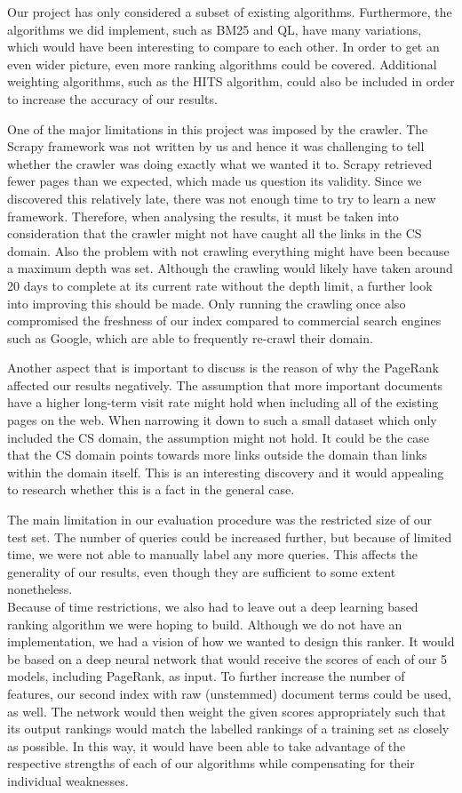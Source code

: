Our project has only considered a subset of existing algorithms. Furthermore, the algorithms we did implement, such as BM25 and QL, have many variations, which would have been interesting to compare to each other. In order to get an even wider picture, even more ranking algorithms could be covered. Additional weighting algorithms, such as the HITS algorithm, could also be included in order to increase the accuracy of our results.

One of the major limitations in this project was imposed by the crawler. The Scrapy framework was not written by us and hence it was challenging to tell whether the crawler was doing exactly what we wanted it to. Scrapy retrieved fewer pages than we expected, which made us question its validity. Since we discovered this relatively late, there was not enough time to try to learn a new framework. Therefore, when analysing the results, it must be taken into consideration that the crawler might not have caught all the links in the CS domain. Also the problem with not crawling everything might have been because a maximum depth was set. Although the crawling would likely have taken around 20 days to complete at its current rate without the depth limit, a further look into improving this should be made. Only running the crawling once also compromised the freshness of our index compared to commercial search engines such as Google, which are able to frequently re-crawl their domain.

Another aspect that is important to discuss is the reason of why the PageRank affected our results negatively. The assumption that more important documents have a higher long-term visit rate might hold when including all of the existing pages on the web. When narrowing it down to such a small dataset which only included the CS domain, the assumption might not hold. It could be the case that the CS domain points towards more links outside the domain than links within the domain itself. This is an interesting discovery and it would appealing to research whether this is a fact in the general case.

The main limitation in our evaluation procedure was the restricted size of our test set. The number of queries could be increased further, but because of limited time, we were not able to manually label any more queries. This affects the generality of our results, even though they are sufficient to some extent nonetheless.\\

Because of time restrictions, we also had to leave out a deep learning based ranking algorithm we were hoping to build. Although we do not have an implementation, we had a vision of how we wanted to design this ranker. It would be based on a deep neural network that would receive the scores of each of our 5 models, including PageRank, as input. To further increase the number of features, our second index with raw (unstemmed) document terms could be used, as well. The network would then weight the given scores appropriately such that its output rankings would match the labelled rankings of a training set as closely as possible. In this way, it would have been able to take advantage of the respective strengths of each of our algorithms while compensating for their individual weaknesses.


